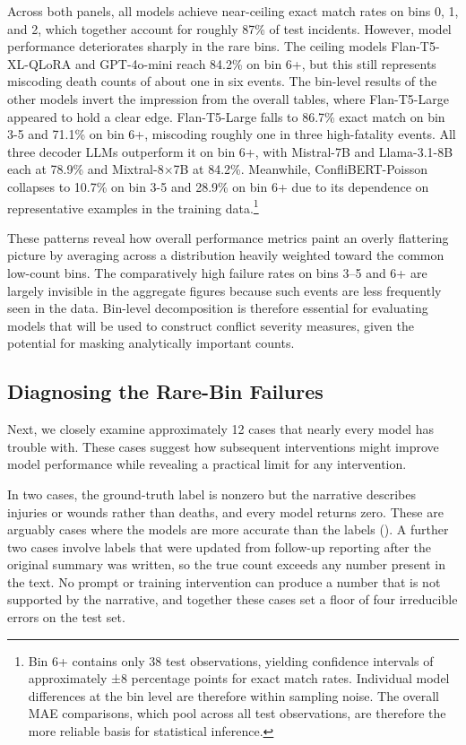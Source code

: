 \documentclass[
  11pt,
]{article}
\begin{document}
Across both panels, all models achieve near-ceiling exact match rates on
bins 0, 1, and 2, which together account for roughly 87\% of test
incidents. However, model performance deteriorates sharply in the rare
bins. The ceiling models Flan-T5-XL-QLoRA and GPT-4o-mini reach 84.2\%
on bin 6+, but this still represents miscoding death counts of about one
in six events. The bin-level results of the other models invert the
impression from the overall tables, where Flan-T5-Large appeared to hold
a clear edge. Flan-T5-Large falls to 86.7\% exact match on bin 3-5 and
71.1\% on bin 6+, miscoding roughly one in three high-fatality events.
All three decoder LLMs outperform it on bin 6+, with Mistral-7B and
Llama-3.1-8B each at 78.9\% and Mixtral-8×7B at 84.2\%. Meanwhile,
ConfliBERT-Poisson collapses to 10.7\% on bin 3-5 and 28.9\% on bin 6+
due to its dependence on representative examples in the training
data.\footnote{Bin 6+ contains only 38 test observations, yielding
  confidence intervals of approximately ±8 percentage points for exact
  match rates. Individual model differences at the bin level are
  therefore within sampling noise. The overall MAE comparisons, which
  pool across all test observations, are therefore the more reliable
  basis for statistical inference.}

These patterns reveal how overall performance metrics paint an overly
flattering picture by averaging across a distribution heavily weighted
toward the common low-count bins. The comparatively high failure rates
on bins 3--5 and 6+ are largely invisible in the aggregate figures
because such events are less frequently seen in the data. Bin-level
decomposition is therefore essential for evaluating models that will be
used to construct conflict severity measures, given the potential for
masking analytically important counts.

\subsection{Diagnosing the Rare-Bin
Failures}\label{diagnosing-the-rare-bin-failures}

Next, we closely examine approximately 12 cases that nearly every model
has trouble with. These cases suggest how subsequent interventions might
improve model performance while revealing a practical limit for any
intervention.

In two cases, the ground-truth label is nonzero but the narrative
describes injuries or wounds rather than deaths, and every model returns
zero. These are arguably cases where the models are more accurate than
the labels (). A further two cases involve labels that were updated from
follow-up reporting after the original summary was written, so the true
count exceeds any number present in the text. No prompt or training
intervention can produce a number that is not supported by the
narrative, and together these cases set a floor of four irreducible
errors on the test set.
\end{document}
